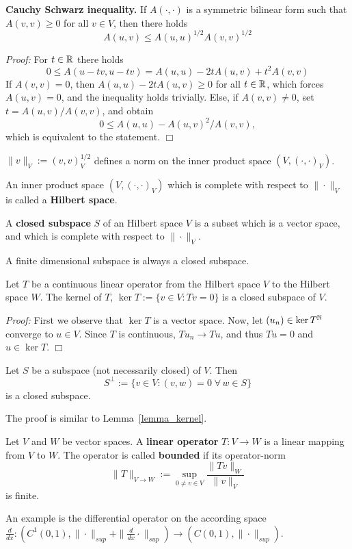 \begin{lemma}{\bf Cauchy Schwarz inequality.} If $A(\cdot,\cdot)$ is a symmetric
bilinear form such that $A(v,v) \geq 0$ for all $v \in V$, then there holds
$$
A(u,v) \leq A(u,u)^{1/2} A(v,v)^{1/2}
$$
\end{lemma}
{\em Proof:} For $t \in {\mathbb R}$ there holds
$$
0 \leq A(u-tv, u-tv) = A(u,u) - 2 t A(u,v) + t^2 A(v,v)
$$
If $A(v,v) = 0$, then $A(u,u)-2tA(u,v) \geq 0$ for all $t \in {\mathbb R}$, which
forces $A(u,v) = 0$, and the inequality holds trivially. Else, if $A(v,v) \neq 0$, set $t = A(u,v) / A(v,v)$, and obtain
$$
0 \leq A(u,u) - A(u,v)^2 / A(v,v),
$$
which is equivalent to the statement.
\hfill $\Box$
\begin{lemma} $\| v \|_V := (v,v)_V^{1/2}$ defines a norm on the inner product
space $(V, (\cdot,\cdot)_V)$.
\end{lemma}

\begin{definition} An inner product space $(V,(\cdot,\cdot)_V)$ which is
complete with respect to $\|\cdot\|_V$ is called a {\bf Hilbert space}.
\end{definition}

\begin{definition} A {\bf closed subspace} $S$ of an Hilbert space $V$
is a subset which is a vector space, and which is complete with respect to 
$\|\cdot \|_V$.
\end{definition}
\noindent
A finite dimensional subspace is always a closed subspace. 

\begin{lemma} \label{lemma_kernel}
Let $T$ be a continuous linear operator from the Hilbert space $V$
to the Hilbert space $W$. The kernel of $T$, $\operatorname{ker} T := \{ v \in V : T v = 0 \}$ is a closed subspace of $V$.
\end{lemma}
{\em Proof:} First we observe that $\operatorname{ker} T$ is a vector space.
Now, let $(u_n) \in \operatorname{ker} T^{\mathbb N}$ converge to $u \in V$. Since
$T$ is continuous, $T u_n \rightarrow T u$, and thus $T u = 0$ and $u \in \operatorname{ker} T$.
\hfill $\Box$

\begin{lemma} Let $S$ be a subspace (not necessarily closed) of $V$. Then
$$
S^\bot := \{ v \in V : (v,w) = 0 \; \forall \, w \in S \}
$$
is a closed subspace.
\end{lemma}
\noindent
The proof is similar to Lemma~\ref{lemma_kernel}.

\begin{definition} Let $V$ and $W$ be vector spaces. A {\bf linear operator} $T : V \rightarrow W$ is a linear mapping from $V$ to $W$. The operator is called {\bf bounded} if its operator-norm
$$
\| T \|_{V \rightarrow W} := \sup_{0 \neq v \in V} \frac{ \| T v \|_W } { \| v \|_V}
$$
is finite. 
\end{definition}
An example is the differential operator on the according space $\frac{d}{dx} : (C^1(0,1), \| \cdot \|_{sup} + \| \frac{d}{dx} \cdot \|_{sup}) \rightarrow ( C(0,1), \| \cdot \|_{sup})$.

